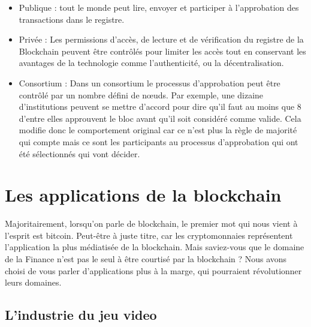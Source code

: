 \documentclass[12pt, a4paper, oneside]{book}
\begin{document}
\begin{itemize}


\item Publique : tout le monde peut lire, envoyer et participer à l'approbation des transactions dans le registre.\\

\item Privée : Les permissions d'accès, de lecture et de vérification du registre de la Blockchain peuvent être contrôlés pour limiter les accès tout en conservant les avantages de la technologie comme l'authenticité, ou la décentralisation.\\

\item Consortium : Dans un consortium le processus d'approbation peut être contrôlé par un nombre défini de nœuds. Par exemple, une dizaine d'institutions peuvent se mettre d'accord pour dire qu'il faut au moins que 8 d'entre elles approuvent le bloc avant qu'il soit considéré comme valide. Cela modifie donc le comportement original car ce n'est plus la règle de majorité qui compte mais ce sont les participants au processus d'approbation qui ont été sélectionnés qui vont décider.\\

\end{itemize}
 
    
    \chapter{Les applications de la blockchain}

    Majoritairement, lorsqu’on parle de blockchain, le premier mot qui nous vient à l’esprit est bitcoin. Peut-être à juste titre, car les cryptomonnaies représentent l’application la plus médiatisée de la blockchain. Mais saviez-vous que le domaine de la Finance n’est pas le seul à être courtisé par la blockchain ? Nous avons choisi de vous parler d’applications plus à la marge, qui pourraient révolutionner leurs domaines.

    \section{L'industrie du jeu video}
\end{document}
